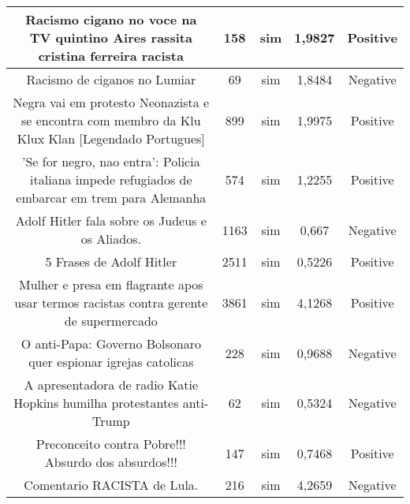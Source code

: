 \documentclass[11pt]{article}
\newlength\mylength
\begin{document}
\begin{center}
\begin{longtable}{||C{.40\mylength}||C{.20\mylength}||C{.20\mylength}||C{.30\mylength}||C{.20\mylength}||}
   Racismo cigano no voce na TV  quintino Aires rassita cristina ferreira racista  & 158 & sim & 1,9827 & Positive \\  \hline
   Racismo de ciganos no Lumiar  & 69 & sim & 1,8484 & Negative \\  \hline
   Negra vai em protesto Neonazista e se encontra com membro da Klu Klux Klan [Legendado Portugues]  & 899 & sim & 1,9975 & Positive \\  \hline
   'Se for negro, nao entra': Policia italiana impede refugiados de embarcar em trem para Alemanha  & 574 & sim & 1,2255 & Positive \\  \hline
   Adolf Hitler fala sobre os Judeus e os Aliados.  & 1163 & sim & 0,667 & Negative \\  \hline
   5 Frases de Adolf Hitler  & 2511 & sim & 0,5226 & Positive \\  \hline
   Mulher e presa em flagrante apos usar termos racistas contra gerente de supermercado  & 3861 & sim & 4,1268 & Positive \\  \hline
   O anti-Papa: Governo Bolsonaro quer espionar igrejas catolicas  & 228 & sim & 0,9688 & Negative \\  \hline
   A apresentadora de radio Katie Hopkins humilha protestantes anti-Trump  & 62 & sim & 0,5324 & Negative \\  \hline
   Preconceito contra Pobre!!! Absurdo dos absurdos!!!  & 147 & sim & 0,7468 & Positive \\  \hline
   Comentario RACISTA de Lula.  & 216 & sim & 4,2659 & Negative \\  \hline

\end{longtable}
\end{center}
\end{document}

